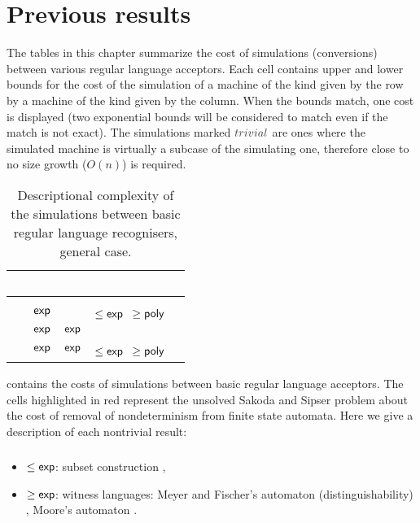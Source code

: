 \chapter{Previous results}
The tables in this chapter summarize the cost of simulations (conversions) between various regular language acceptors.
Each cell contains upper and lower bounds for the cost of the simulation of a machine of the kind given by the row by a machine of the kind given by the column.
When the bounds match, one cost is displayed (two exponential bounds will be considered to match even if the match is not exact).
The simulations marked $\Ctriv$ are ones where the simulated machine is virtually a subcase of the simulating one, therefore close to no size growth ($O(n)$) is required.


\begin{table}
	\centering
	\renewcommand{\hstdef}{.35}
	\begin{tabular}{|l|l|l|p{2.9em}|l|}
		\hline
		~     & \ODFA   & \ONFA   & \TDFA                          & \TNFA  \\ \hline
		\ODFA & \cY     & \Ctriv  & \Ctriv                         & \Ctriv \\ \hline
		\ONFA & $\mathsf{exp}$ & \cY     & \cR $\le\Cexp\hst$ $\ge\mathsf{poly}$ & \Ctriv \\ \hline
		\TDFA & $\mathsf{exp}$ & $\mathsf{exp}$ & \cY                            & \Ctriv \\ \hline
		\TNFA & $\mathsf{exp}$ & $\mathsf{exp}$ & \cR $\le\Cexp\hst$ $\ge\mathsf{poly}$ & \cY    \\ \hline
	\end{tabular}
	\caption{Descriptional complexity of the simulations between basic regular language recognisers, general case.}
	\label{tab:sims-core-general}
\end{table}

 contains the costs of simulations between basic regular language acceptors.
The cells highlighted in red represent the unsolved Sakoda and Sipser problem \cite{SakSip78} about the cost of removal of nondeterminism from finite state automata.
Here we give a description of each nontrivial result:

\paragraph{\ONFA{}\tto\ODFA}\label{cost:1NFAto1DFA}
\begin{itemize}
	\item $\le\mathsf{exp}$: subset construction \cite{RabSco59},
	\item $\ge\mathsf{exp}$: witness languages: Meyer and Fischer's automaton (distinguishability) \cite{MeyFis71}, Moore's automaton \cite{Moo71}.
\end{itemize}
